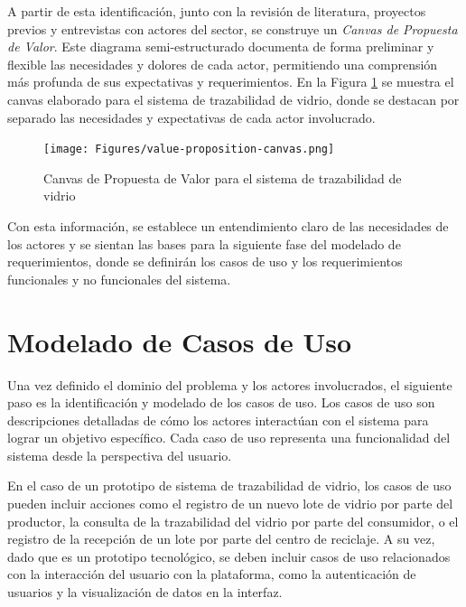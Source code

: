 

A partir de esta identificación, junto con la revisión de literatura, proyectos previos y entrevistas con actores del sector, se construye un \textit{Canvas de Propuesta de Valor}. Este diagrama semi-estructurado documenta de forma preliminar y flexible las necesidades y dolores de cada actor, permitiendo una comprensión más profunda de sus expectativas y requerimientos. En la Figura \ref{fig:value-proposition-canvas} se muestra el canvas elaborado para el sistema de trazabilidad de vidrio, donde se destacan por separado las necesidades y expectativas de cada actor involucrado.

\begin{figure}[!htpb]
		\centering
		\texttt{[image: Figures/value-proposition-canvas.png]}
		\caption{Canvas de Propuesta de Valor para el sistema de trazabilidad de vidrio}
		\label{fig:value-proposition-canvas}
\end{figure}

Con esta información, se establece un entendimiento claro de las necesidades de los actores y se sientan las bases para la siguiente fase del modelado de requerimientos, donde se definirán los casos de uso y los requerimientos funcionales y no funcionales del sistema.

\section{Modelado de Casos de Uso}
\label{sec:use-cases}

Una vez definido el dominio del problema y los actores involucrados, el siguiente paso es la identificación y modelado de los casos de uso. Los casos de uso son descripciones detalladas de cómo los actores interactúan con el sistema para lograr un objetivo específico. Cada caso de uso representa una funcionalidad del sistema desde la perspectiva del usuario.

En el caso de un prototipo de sistema de trazabilidad de vidrio, los casos de uso pueden incluir acciones como el registro de un nuevo lote de vidrio por parte del productor, la consulta de la trazabilidad del vidrio por parte del consumidor, o el registro de la recepción de un lote por parte del centro de reciclaje. A su vez, dado que es un prototipo tecnológico, se deben incluir casos de uso relacionados con la interacción del usuario con la plataforma, como la autenticación de usuarios y la visualización de datos en la interfaz.


